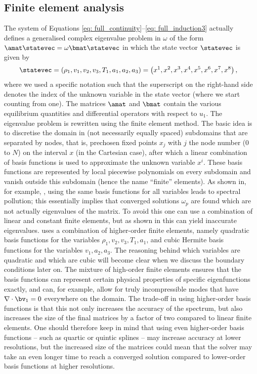 \subsection{Finite element analysis} \label{ss: finite_elements}
The system of Equations \eqref{eq: full_continuity}--\eqref{eq: full_induction3} actually defines a generalised complex eigenvalue problem in $\omega$ of the form $\amat \statevec = \omega \bmat \statevec$ in which the state vector $\statevec$ is given by
\begin{equation} \label{eq: statevector}
  \statevec = \left(\rho_1, v_1, v_2, v_3, T_1, a_1, a_2, a_3\right)
   = \left(x^1, x^2, x^3, x^4, x^5, x^6, x^7, x^8\right),
\end{equation}
where we used a specific notation such that the superscript on the right-hand side denotes the index of the unknown variable in the state vector (where we start counting from one). The matrices $\amat$ and $\bmat$ contain the various equilibrium quantities and differential operators with respect to $u_1$. The eigenvalue problem is rewritten using the finite element method. The basic idea is to discretise the domain in (not necessarily equally spaced) subdomains that are separated by nodes, that is, prechosen fixed points $x_j$ with $j$ the node number ($0$ to $N$) on the interval $x$ (in the Cartesian case), after which a linear combination of basis functions is used to approximate the unknown variable $x^i$. These basis functions are represented by local piecewise polynomials on every subdomain and vanish outside this subdomain (hence the name ``finite'' elements). As shown in, for example, \citet{rappaz1977}, using the same basis functions for all variables leads to spectral pollution; this essentially implies that converged solutions $\omega_p$ are found which are not actually eigenvalues of the matrix. To avoid this one can use a combination of linear and constant finite elements, but as shown in \citet{kerner1985} this can yield inaccurate eigenvalues.
{\legolas} uses a combination of higher-order finite elements, namely quadratic basis functions for the variables $\rho_1, v_2, v_3, T_1, a_1$, and cubic Hermite basis functions for the variables $v_1, a_2, a_3$. The reasoning behind which variables are quadratic and which are cubic will become clear when we discuss the boundary conditions later on. The mixture of high-order finite elements ensures that the basis functions can represent certain physical properties of specific eigenfunctions exactly, and can, for example, allow for truly incompressible modes that have $\nabla \cdot \bv_1 = 0$ everywhere on the domain. The trade-off in using higher-order basis functions is that this not only increases the accuracy of the spectrum, but also increases the size of the final matrices by a factor of two compared to linear finite elements. One should therefore keep in mind that using even higher-order basis functions -- such as quartic or quintic splines -- may increase accuracy at lower resolutions, but the increased size of the matrices could mean that the solver may take an even longer time to reach a converged solution compared to lower-order basis functions at higher resolutions.

